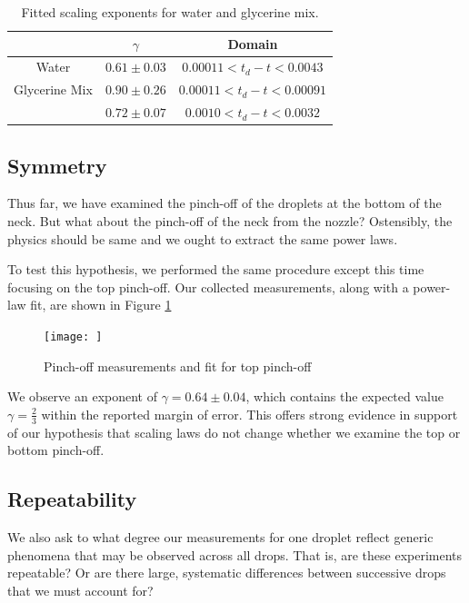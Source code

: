 \documentclass[12pt, letterpaper]{article}
\begin{document}
\begin{table}[!h]
    \centering
    \begin{tabular}{|c|c|c|}
        \hline
         & $\gamma$ & Domain \\
        \hline
        Water & $0.61 \pm 0.03$ & $0.00011 < t_d - t < 0.0043$ \\
        \hline
        Glycerine Mix & $0.90 \pm 0.26$ & $0.00011 < t_d - t < 0.00091$ \\
        & $0.72 \pm 0.07$ & $0.0010 < t_d - t < 0.0032$ \\
        \hline
    \end{tabular}
    \caption{Fitted scaling exponents for water and glycerine mix. }
    \label{tab:exponents}
\end{table}

\subsection{Symmetry}

Thus far, we have examined the pinch-off of the droplets at the bottom of the neck. But what about the pinch-off of the neck from the nozzle? Ostensibly, the physics should be same and we ought to extract the same power laws. 

To test this hypothesis, we performed the same procedure except this time focusing on the top pinch-off. Our collected measurements, along with a power-law fit, are shown in Figure \ref{fig:top-pinchoff}

\begin{figure}[!h]
    \centering
    \texttt{[image: ]}
    \caption{Pinch-off measurements and fit for top pinch-off}
    \label{fig:top-pinchoff}
\end{figure}

We observe an exponent of $\gamma=0.64 \pm 0.04$, which contains the expected value $\gamma=\frac{2}{3}$ within the reported margin of error. This offers strong evidence in support of our hypothesis that scaling laws do not change whether we examine the top or bottom pinch-off. 

\subsection{Repeatability}

We also ask to what degree our measurements for one droplet reflect generic phenomena that may be observed across all drops. That is, are these experiments repeatable? Or are there large, systematic differences between successive drops that we must account for? 
\end{document}
